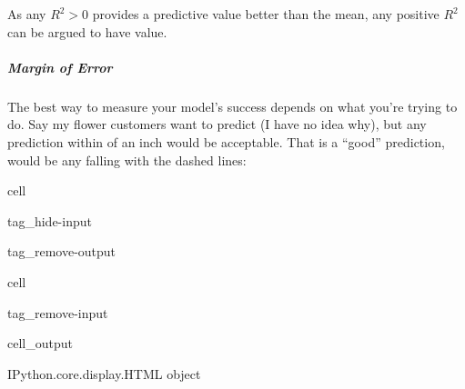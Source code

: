 \documentclass[letterpaper,10pt,english]{jupyterBook}
\begin{document}
\sphinxAtStartPar
As any \(R^{2} > 0\) provides a predictive value better than the mean, any positive \(R^{2}\) can be argued to have value.


\subparagraph{Margin of Error}
\label{\detokenize{task2_c/example_sup_reg/sup_reg_ex_accuracy:margin-of-error}}
\sphinxAtStartPar
The best way to measure your model’s success depends on what you’re trying to do. Say my flower customers want to predict  (I have no idea why), but any prediction within  of an inch would be acceptable. That is a “good” prediction, would be any falling with the dashed lines:

\begin{sphinxuseclass}{cell}
\begin{sphinxuseclass}{tag_hide-input}
\begin{sphinxuseclass}{tag_remove-output}
\end{sphinxuseclass}
\end{sphinxuseclass}
\end{sphinxuseclass}
\begin{sphinxuseclass}{cell}
\begin{sphinxuseclass}{tag_remove-input}\begin{sphinxVerbatimOutput}

\begin{sphinxuseclass}{cell_output}
\begin{sphinxVerbatim}[commandchars=\\\{\}]
\PYGZlt{}IPython.core.display.HTML object\PYGZgt{}
\end{sphinxVerbatim}

\end{sphinxuseclass}\end{sphinxVerbatimOutput}

\end{sphinxuseclass}
\end{sphinxuseclass}
\end{document}
